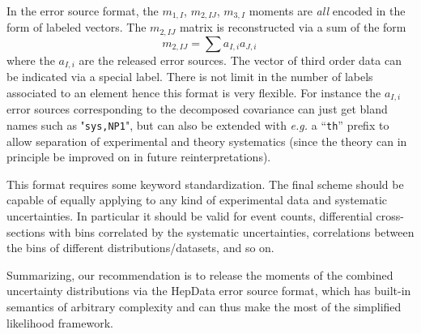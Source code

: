 \documentclass[11pt]{article}
\newcommand{\be}{\begin{equation}}
\newcommand{\ee}{\end{equation}}
\begin{document}
In the error source format, the $m_{1,I}$, $m_{2,IJ}$, $m_{3,I}$ moments are
\textit{all} encoded in the form of labeled vectors. The $m_{2,IJ}$ matrix is
reconstructed via a sum of the form \be m_{2,IJ}= \sum {a_{I,i}a_{J,i}} \, \ee
where the $a_{I,i}$ are the released error sources.
The vector of third order data can be  indicated via a special label.
There is not limit in the number of labels associated to an element hence this format is very flexible.
For instance the $a_{I,i}$ error sources corresponding to the decomposed covariance  can just get bland names such as "{\tt sys,NP1}", but  can also be extended with \textit{e.g.} a ``{\tt th}'' prefix to allow separation of experimental and theory systematics (since the theory can in principle be improved on in future reinterpretations).


This format requires some keyword standardization.  The final scheme should
be capable of equally applying to any kind of experimental data and systematic uncertainties. In particular it should be valid for event counts,  differential cross-sections with bins correlated by the systematic uncertainties, correlations between  the bins of different distributions/datasets, and so on.




Summarizing, our recommendation is to release the moments of the combined uncertainty distributions via the HepData error source format, which has built-in semantics of arbitrary complexity and can thus  make the most of the simplified likelihood framework.




\end{document}
